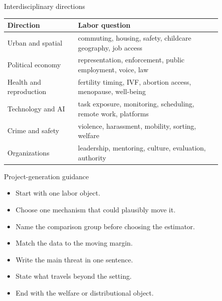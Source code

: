\documentclass[aspectratio=169,11pt]{beamer}
\begin{document}
\begin{frame}{Interdisciplinary directions}
\scriptsize
\begin{tabular}{p{0.28\linewidth} p{0.58\linewidth}}
\toprule
Direction & Labor question \\
\midrule
Urban and spatial & commuting, housing, safety, childcare geography, job access \\
Political economy & representation, enforcement, public employment, voice, law \\
Health and reproduction & fertility timing, IVF, abortion access, menopause, well-being \\
Technology and AI & task exposure, monitoring, scheduling, remote work, platforms \\
Crime and safety & violence, harassment, mobility, sorting, welfare \\
Organizations & leadership, mentoring, culture, evaluation, authority \\
\bottomrule
\end{tabular}
\end{frame}

\begin{frame}{Project-generation guidance}
\begin{itemize}
    \item Start with one labor object.
    \item Choose one mechanism that could plausibly move it.
    \item Name the comparison group before choosing the estimator.
    \item Match the data to the moving margin.
    \item Write the main threat in one sentence.
    \item State what travels beyond the setting.
    \item End with the welfare or distributional object.
\end{itemize}
\end{frame}
\end{document}

